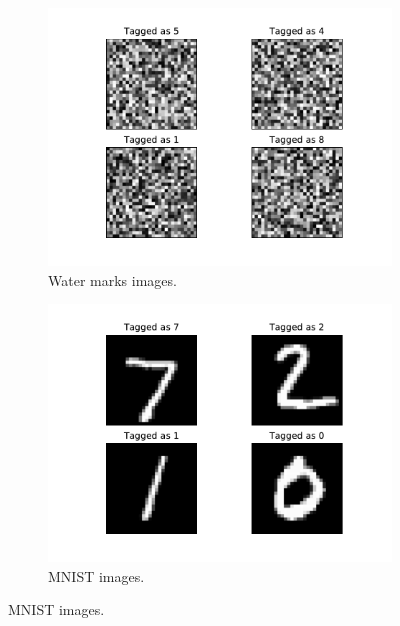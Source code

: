 \documentclass[a4paper]{llncs}
\begin{document}
\begin{figure}[h!]
  \centering
  \begin{subfigure}{0.4\linewidth}
    \includegraphics[width=\linewidth]{../data/wm.pdf}
     \caption{Water marks images.}
  \end{subfigure}
  \begin{subfigure}{0.4\linewidth}
    \includegraphics[width=\linewidth]{../data/mnist.pdf}
    \caption{MNIST images.}
  \end{subfigure}
  \label{fig:imageExamples}
\end{figure}
\end{document}
